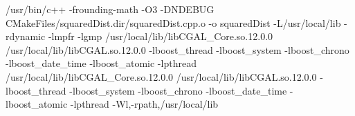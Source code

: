 /usr/bin/c++    -frounding-math -O3 -DNDEBUG   CMakeFiles/squaredDist.dir/squaredDist.cpp.o  -o squaredDist  -L/usr/local/lib -rdynamic -lmpfr -lgmp /usr/local/lib/libCGAL_Core.so.12.0.0 /usr/local/lib/libCGAL.so.12.0.0 -lboost_thread -lboost_system -lboost_chrono -lboost_date_time -lboost_atomic -lpthread /usr/local/lib/libCGAL_Core.so.12.0.0 /usr/local/lib/libCGAL.so.12.0.0 -lboost_thread -lboost_system -lboost_chrono -lboost_date_time -lboost_atomic -lpthread -Wl,-rpath,/usr/local/lib 
